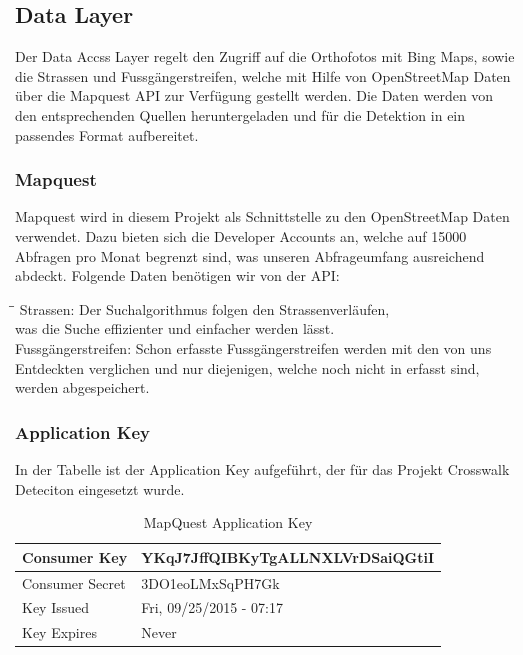 \subsection{Data Layer}
Der Data Accss Layer regelt den Zugriff auf die Orthofotos mit Bing Maps, sowie die Strassen und Fussgängerstreifen, welche mit Hilfe von OpenStreetMap Daten über die Mapquest API zur Verfügung gestellt werden. Die Daten werden von den entsprechenden Quellen heruntergeladen und für die Detektion in ein passendes Format aufbereitet.

\subsubsection{Mapquest}
\Gls{Mapquest} \cite{Mapquest} wird in diesem Projekt als Schnittstelle zu den OpenStreetMap Daten verwendet. Dazu bieten sich die Developer Accounts an, welche auf 15000 Abfragen pro Monat begrenzt sind, was unseren Abfrageumfang ausreichend abdeckt.
Folgende Daten benötigen wir von der API:
\begin{tabbing}[H]
    \hspace*{3cm}\=\hspace*{9cm}\= \kill
    Strassen: \> Der Suchalgorithmus folgen den Strassenverläufen, \\
     			\> was die Suche effizienter und einfacher werden lässt.\\
    Fussgängerstreifen: \> Schon erfasste Fussgängerstreifen werden mit den von uns  \\ \> Entdeckten verglichen und nur diejenigen, welche noch nicht in erfasst sind,\\ \> werden abgespeichert.
\end{tabbing}


\subsubsection{Application Key}
In der Tabelle ist der Application Key aufgeführt, der für das Projekt Crosswalk Deteciton eingesetzt wurde.
\\
\begin{table}[H]
	\begin{tabular}{ | p{6cm} | p{6cm}  | }
		\hline    
		Consumer Key &  YKqJ7JffQIBKyTgALLNXLVrDSaiQGtiI \\ \hline
		Consumer Secret & 3DO1eoLMxSqPH7Gk \\ \hline
		Key Issued & Fri, 09/25/2015 - 07:17 \\ \hline
		Key Expires & Never \\ \hline
	\end{tabular}
	\caption[MapQuest Application Key]{MapQuest Application Key}
\end{table}

